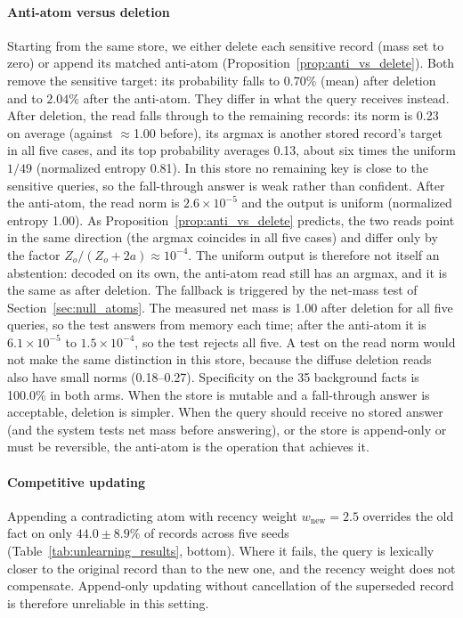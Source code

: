 \documentclass[preprint,12pt]{elsarticle}
\newif\ifmarkchanges
\newcommand{\rev}[1]{#1}
\newcommand{\revii}[1]{\ifmarkchanges{\color{blue}#1}\else#1\fi}
\begin{document}
\paragraph{Anti-atom versus deletion}
\rev{Starting from the same store, we either delete each sensitive record (mass set to zero) or append its matched anti-atom (Proposition~\ref{prop:anti_vs_delete}). Both remove the sensitive target: its probability falls to 0.70\% (mean) after deletion and to $2.04\%$ after the anti-atom. They differ in what the query receives instead. After deletion, the read falls through to the remaining records: its norm is 0.23 on average (against $\approx$1.00 before), its argmax is another stored record's target in all five cases, and its top probability averages 0.13, about six times the uniform $1/49$ (normalized entropy 0.81). In this store no remaining key is close to the sensitive queries, so the fall-through answer is weak rather than confident. After the anti-atom, the read norm is $2.6\times10^{-5}$ and the output is uniform (normalized entropy 1.00). As Proposition~\ref{prop:anti_vs_delete} predicts, the two reads point in the same direction (the argmax coincides in all five cases) and differ only by the factor $Z_o/(Z_o+2a)\approx10^{-4}$. \revii{The uniform output is therefore not itself an abstention: decoded on its own, the anti-atom read still has an argmax, and it is the same as after deletion. The fallback is triggered by the net-mass test of Section~\ref{sec:null_atoms}. The measured net mass is 1.00 after deletion for all five queries, so the test answers from memory each time; after the anti-atom it is $6.1\times10^{-5}$ to $1.5\times10^{-4}$, so the test rejects all five. A test on the read norm would not make the same distinction in this store, because the diffuse deletion reads also have small norms (0.18--0.27).} Specificity on the 35 background facts is 100.0\% in both arms. When the store is mutable and a fall-through answer is acceptable, deletion is simpler. When the query should receive no stored answer \revii{(and the system tests net mass before answering)}, or the store is append-only or must be reversible, the anti-atom is the operation that achieves it.}

\paragraph{Competitive updating}
Appending a contradicting atom with recency weight $w_{\mathrm{new}} = 2.5$ overrides the old fact on only $44.0\pm8.9\%$ of records across five seeds (Table~\ref{tab:unlearning_results}, bottom). Where it fails, the query is lexically closer to the original record than to the new one, and the recency weight does not compensate. Append-only updating without cancellation of the superseded record is therefore unreliable in this setting.
\end{document}

